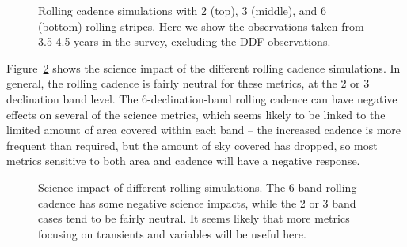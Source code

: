 \begin{figure}
\caption{Rolling cadence simulations with 2 (top), 3 (middle), and 6 (bottom) rolling stripes. Here we show the observations taken from 3.5-4.5 years in the survey, excluding the DDF observations.} \label{fig:rollingstripes}
\end{figure}

Figure~\ref{fig:rolling_radar} shows the science impact of the different rolling cadence simulations. In general, the rolling cadence is fairly neutral for these metrics, at the 2 or 3 declination band level. The 6-declination-band rolling cadence can have negative effects on several of the science metrics, which seems likely to be linked to the limited amount of area covered within each band -- the increased cadence is more frequent than required, but the amount of sky covered has dropped, so most metrics sensitive to both area and cadence will have a negative response.

\begin{figure}
\caption{Science impact of different rolling simulations. The 6-band rolling cadence has some negative science impacts, while the 2 or 3 band cases tend to be fairly neutral. It seems likely that more metrics focusing on transients and variables will be useful here.}\label{fig:rolling_radar}
\end{figure}


